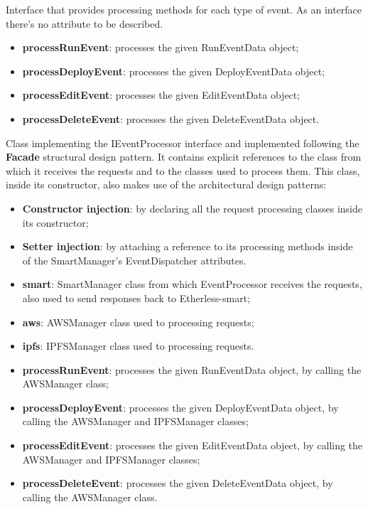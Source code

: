 	Interface that provides processing methods for each type of event.
	As an interface there's no attribute to be described.
	\begin{itemize}
		\item \textbf{processRunEvent}: processes the given RunEventData object;
		\item \textbf{processDeployEvent}: processes the given DeployEventData object;
		\item \textbf{processEditEvent}: processes the given EditEventData object;
		\item \textbf{processDeleteEvent}: processes the given DeleteEventData object.
	\end{itemize}
	Class implementing the IEventProcessor interface and implemented following the \textbf{Facade} structural design pattern. It contains explicit references to the class from which it receives the requests and to the classes used to process them. This class, inside its constructor, also makes use of the architectural design patterns:
	\begin{itemize}
		\item \textbf{Constructor injection}: by declaring all the request processing classes inside its constructor;
		\item \textbf{Setter injection}: by attaching a reference to its processing methods inside of the SmartManager's EventDispatcher attributes.
	\end{itemize}
	\begin{itemize}
		\item \textbf{smart}: SmartManager class from which EventProcessor receives the requests, also used to send responses back to Etherless-smart;
		\item \textbf{aws}: AWSManager class used to processing requests;
		\item \textbf{ipfs}: IPFSManager class used to processing requests.
	\end{itemize}
	\begin{itemize}
		\item \textbf{processRunEvent}: processes the given RunEventData object, by calling the AWSManager class;
		\item \textbf{processDeployEvent}: processes the given DeployEventData object, by calling the AWSManager and IPFSManager classes;
		\item \textbf{processEditEvent}: processes the given EditEventData object, by calling the AWSManager and IPFSManager classes;
		\item \textbf{processDeleteEvent}: processes the given DeleteEventData object, by calling the AWSManager class.
	\end{itemize}
